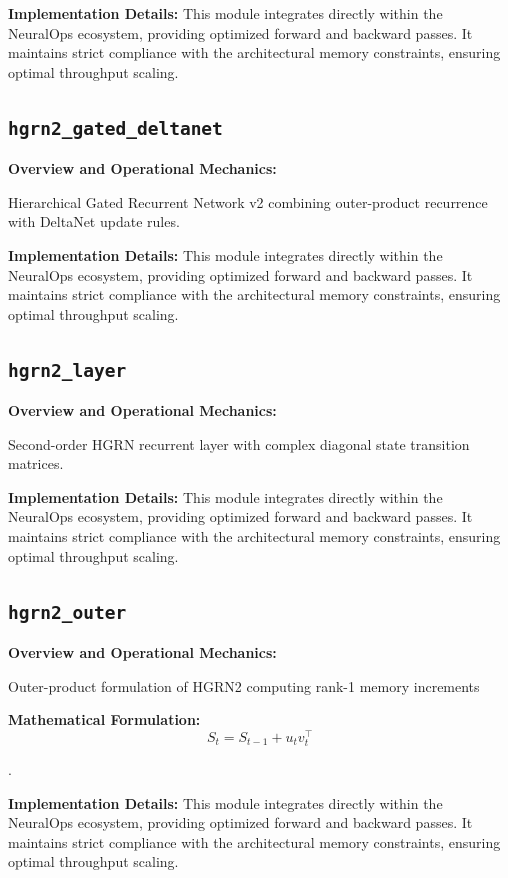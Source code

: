 \documentclass[10pt,twocolumn,letterpaper]{article}
\begin{document}
\textbf{Implementation Details:}
This module integrates directly within the NeuralOps ecosystem, providing optimized forward and backward passes. It maintains strict compliance with the architectural memory constraints, ensuring optimal throughput scaling.

\subsection{\texttt{hgrn2\_gated\_deltanet}}
\textbf{Overview and Operational Mechanics:}

Hierarchical Gated Recurrent Network v2 combining outer-product recurrence with DeltaNet update rules.

\textbf{Implementation Details:}
This module integrates directly within the NeuralOps ecosystem, providing optimized forward and backward passes. It maintains strict compliance with the architectural memory constraints, ensuring optimal throughput scaling.

\subsection{\texttt{hgrn2\_layer}}
\textbf{Overview and Operational Mechanics:}

Second-order HGRN recurrent layer with complex diagonal state transition matrices.

\textbf{Implementation Details:}
This module integrates directly within the NeuralOps ecosystem, providing optimized forward and backward passes. It maintains strict compliance with the architectural memory constraints, ensuring optimal throughput scaling.

\subsection{\texttt{hgrn2\_outer}}
\textbf{Overview and Operational Mechanics:}

Outer-product formulation of HGRN2 computing rank-1 memory increments

\textbf{Mathematical Formulation:}
\begin{equation}
S_t = S_{t-1} + u_t v_t^\top
\end{equation}

.

\textbf{Implementation Details:}
This module integrates directly within the NeuralOps ecosystem, providing optimized forward and backward passes. It maintains strict compliance with the architectural memory constraints, ensuring optimal throughput scaling.
\end{document}
